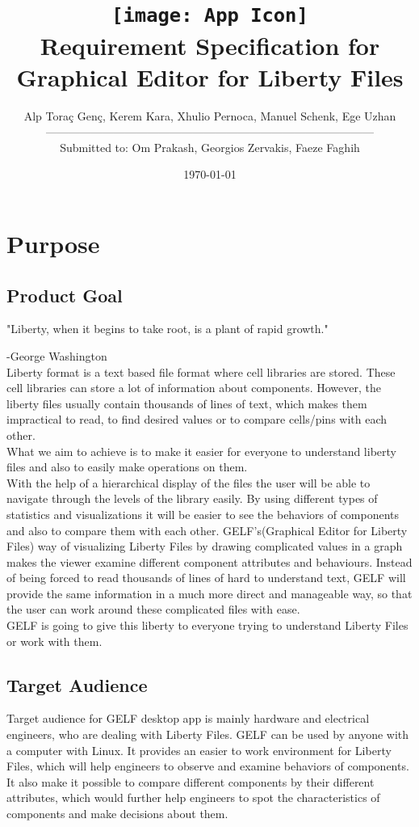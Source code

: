 \documentclass[10pt,a4paper]{report}
\title{\texttt{[image: App Icon]}\\Requirement Specification for Graphical Editor for Liberty Files}
\author{Alp Toraç Genç, Kerem Kara, Xhulio Pernoca, Manuel Schenk, Ege Uzhan \leavevmode \\---------------------------------------------------------------------------------------\\
Submitted to: Om Prakash, Georgios Zervakis, Faeze Faghih}
\date{\today}
\begin{document}
\maketitle
\label{sec:title}
\tableofcontents

\chapter{Purpose}
\section{Product Goal}
\setlength{\parindent}{0pt}
"Liberty, when it begins to take root, is a plant of rapid growth." 

-George Washington \\


Liberty format is a text based file format where cell libraries are stored. These cell libraries can store a lot of information about components. However, the liberty files usually contain thousands of lines of text, which makes them impractical to read, to find desired values or to compare cells/pins with each other.
\\

What we aim to achieve is to make it easier for everyone to understand liberty files and also to easily make operations on them.
\\

With the help of a hierarchical display of the files the user will be able to navigate through the levels of the library easily. By using different types of statistics and visualizations it will be easier to see the behaviors of components and also to compare them with each other. GELF's(Graphical Editor for Liberty Files) way of visualizing Liberty Files by drawing complicated values in a graph makes the viewer examine different component attributes and behaviours. Instead of being forced to read thousands of lines of hard to understand text, GELF will provide the same information in a much more direct and manageable way, so that the user can work around these complicated files with ease.
\\

GELF is going to give this liberty to everyone trying to understand Liberty Files or work with them.
\section{Target Audience}
Target audience for GELF desktop app is mainly hardware and electrical engineers, who are dealing with Liberty Files. GELF can be used by anyone with a computer with Linux. It provides an easier to work environment for Liberty Files, which will help engineers to observe and examine behaviors of components. It also make it possible to compare different components by their different attributes, which would further help engineers to spot the characteristics of components and make decisions about them.
\end{document}
